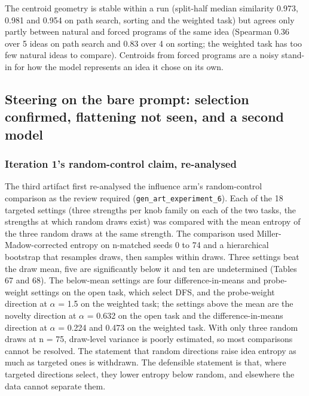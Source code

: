 \documentclass[11pt,letterpaper]{article}
\begin{document}
\endgroup
The centroid geometry is stable within a run (split-half median similarity 0.973, 0.981 and 0.954 on path search, sorting and the weighted task) but agrees only partly between natural and forced programs of the same idea (Spearman 0.36 over 5 ideas on path search and 0.83 over 4 on sorting; the weighted task has too few natural ideas to compare). Centroids from forced programs are a noisy stand-in for how the model represents an idea it chose on its own.

\subsection{Steering on the bare prompt: selection confirmed, flattening not seen, and a second model}
\subsubsection{Iteration 1's random-control claim, re-analysed}
The third artifact first re-analysed the influence arm's random-control comparison as the review required (\texttt{gen\_\allowbreak{}art\_\allowbreak{}experiment\_\allowbreak{}6}). Each of the 18 targeted settings (three strengths per knob family on each of the two tasks, the strengths at which random draws exist) was compared with the mean entropy of the three random draws at the same strength. The comparison used Miller-Madow-corrected entropy on n-matched seeds 0 to 74 and a hierarchical bootstrap that resamples draws, then samples within draws. Three settings beat the draw mean, five are significantly below it and ten are undetermined (Tables 67 and 68). The below-mean settings are four difference-in-means and probe-weight settings on the open task, which select DFS, and the probe-weight direction at \ensuremath{\alpha} = 1.5 on the weighted task; the settings above the mean are the novelty direction at \ensuremath{\alpha} = 0.632 on the open task and the difference-in-means direction at \ensuremath{\alpha} = 0.224 and 0.473 on the weighted task. With only three random draws at n = 75, draw-level variance is poorly estimated, so most comparisons cannot be resolved. The statement that random directions raise idea entropy as much as targeted ones is withdrawn. The defensible statement is that, where targeted directions select, they lower entropy below random, and elsewhere the data cannot separate them.
\end{document}

